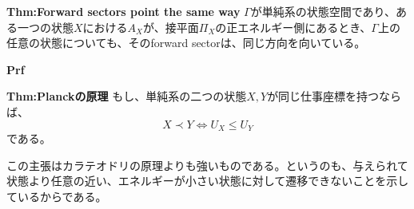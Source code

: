 \documentclass[a4paper,11pt]{jsarticle}
\numberwithin{equation}{section}
\begin{document}
\begin{itembox}[l]{\textbf{Thm:Forward sectors point the same way}}
    $\Gamma$が単純系の状態空間であり、ある一つの状態$X$における$A_X$が、接平面$\Pi_X$の正エネルギー側にあるとき、$\Gamma$上の任意の状態についても、そのforward sectorは、同じ方向を向いている。
\end{itembox}
\textbf{Prf}\\

\begin{itembox}[l]{\textbf{Thm:Planckの原理}}
    もし、単純系の二つの状態$X,Y$が同じ仕事座標を持つならば、
    \begin{equation}
        X \prec Y \Leftrightarrow U_X \leq U_Y
    \end{equation}
    である。
\end{itembox}
この主張はカラテオドリの原理よりも強いものである。というのも、与えられて状態より任意の近い、エネルギーが小さい状態に対して遷移できないことを示しているからである。\\
\end{document}
